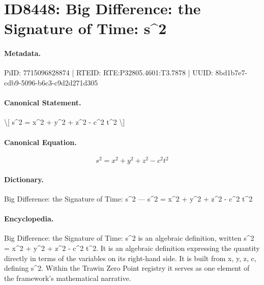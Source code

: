\section*{ID8448: Big Difference: the Signature of Time: s\textasciicircum{}2}
\paragraph{Metadata.}
PiID: 7715096828874 | RTEID: RTE:P32805.4601:T3.7878 | UUID: 8bd1b7e7-cdb9-5096-b6c3-c9d2d271d305

\paragraph{Canonical Statement.}
\textbackslash{}[ s\textasciicircum{}2 = x\textasciicircum{}2 + y\textasciicircum{}2 + z\textasciicircum{}2 - c\textasciicircum{}2 t\textasciicircum{}2 \textbackslash{}]

\paragraph{Canonical Equation.}
\[
s^2 = x^2 + y^2 + z^2 - c^2 t^2
\]

\paragraph{Dictionary.}
Big Difference: the Signature of Time: s\textasciicircum{}2 — s\textasciicircum{}2 = x\textasciicircum{}2 + y\textasciicircum{}2 + z\textasciicircum{}2 - c\textasciicircum{}2 t\textasciicircum{}2

\paragraph{Encyclopedia.}
Big Difference: the Signature of Time: s\textasciicircum{}2 is an algebraic definition, written s\textasciicircum{}2 = x\textasciicircum{}2 + y\textasciicircum{}2 + z\textasciicircum{}2 - c\textasciicircum{}2 t\textasciicircum{}2. It is an algebraic definition expressing the quantity directly in terms of the variables on its right-hand side. It is built from x, y, z, c, defining s\textasciicircum{}2. Within the Trawin Zero Point registry it serves as one element of the framework's mathematical narrative.
